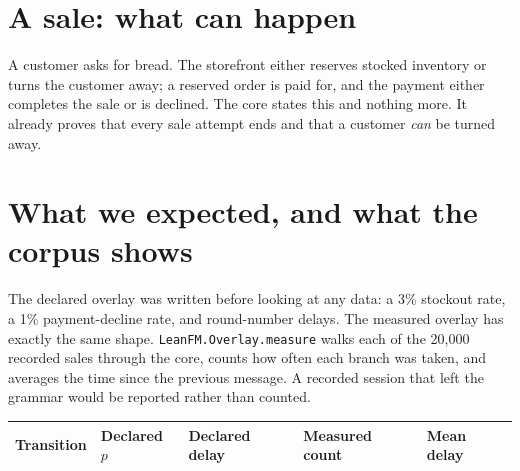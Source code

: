 \section{A sale: what can happen}

A customer asks for bread. The storefront either reserves stocked inventory or
turns the customer away; a reserved order is paid for, and the payment either
completes the sale or is declined. The core states this and nothing more. It
already proves that every sale attempt ends and that a customer \emph{can} be
turned away.

\begin{bakeryfigure}
\caption{The retail-sale core, with the bakery's declared expectations drawn on
its edges. Double borders mark terminal states.}
\label{fig:bakery-sale-states}
\end{bakeryfigure}

\section{What we expected, and what the corpus shows}

The declared overlay was written before looking at any data: a 3\% stockout
rate, a 1\% payment-decline rate, and round-number delays. The measured overlay
has exactly the same shape. \texttt{LeanFM.Overlay.measure} walks each of the
20{,}000 recorded sales through the core, counts how often each branch was
taken, and averages the time since the previous message. A recorded session
that left the grammar would be reported rather than counted.

\begin{bakerytable}
\small
\begin{tabular}{lllll}
\textbf{Transition} & \textbf{Declared $p$} & \textbf{Declared delay} & \textbf{Measured count} & \textbf{Mean delay}\\
\hline

\end{tabular}
\caption{Declared expectations against branch counts and mean delays reduced
from the corpus.}
\label{tab:bakery-overlays}
\end{bakerytable}

